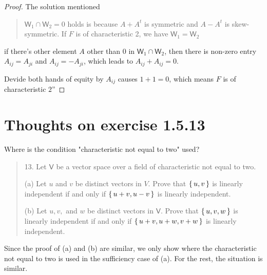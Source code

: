 \documentclass{article}
\newcommand{\0}{\mathit{0}}
\newcommand{\V}{\mathsf{V}}
\begin{document}
\begin{proof}
    The solution mentioned
    \begin{quotation}
        $\mathsf{W}_1 \cap\mathsf{W}_2 ={\0}$ holds is because $A+A^t$ is symmetric and $A-A^t$ is skew-symmetric. If $F$ is of characteristic 2, we have
        $\mathsf{W}_1  =\mathsf{W}_2 $
    \end{quotation}

    if there's other element $A$ other than $\0$ in $\mathsf{W}_1 \cap\mathsf{W}_2$, then there is non-zero entry $A_{ij}=A_{ji}$ and $A_{ij}=-A_{ji}$, which leads to
    $A_{ij}+A_{ij}=0$.

    Devide both hands of equity by $A_{ij}$ causes $1+1=0$, which means $F$ is of characteristic $2$”
\end{proof}

\section{Thoughts on exercise 1.5.13}
Where is the condition "characteristic not equal to two" used?

\begin{quotation}
    13. Let $\V$ be a vector space over a field of characteristic
    not equal to two.

    (a) Let $u$ and $v$ be distinct vectors in $V$. Prove that $\set{u, v}$ is
    linearly independent if and only if $\set{u + v, u - v}$ is linearly independent.

    (b) Let $u, v,$ and $w$ be distinct vectors in $\V$. Prove that $\set{u, v, w}$
    is linearly independent if and only if $\set{u + v, u + w, v + w}$ is linearly
    independent.
\end{quotation}

Since the proof of (a) and (b) are similar,
we only show where the characteristic not equal to two is used in the sufficiency case of (a).
For the rest, the situation is similar.
\end{document}
